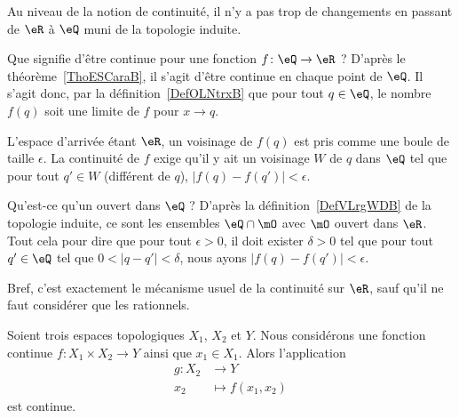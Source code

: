 Au niveau de la notion de continuité, il n'y a pas trop de changements en passant de \( \eR\) à \( \eQ\) muni de la topologie induite.

\begin{example}     \label{EXooHWIIooYYbfGE}
	Que signifie d'être continue pour une fonction \( f\colon \eQ\to \eR\) ? D'après le théorème~\ref{ThoESCaraB}, il s'agit d'être continue en chaque point de \( \eQ\). Il s'agit donc, par la définition~\ref{DefOLNtrxB} que pour tout \( q\in \eQ\), le nombre \( f(q)\) soit une limite de \( f\) pour \( x\to q\).

	L'espace d'arrivée étant \( \eR\), un voisinage de \( f(q)\) est pris comme une boule de taille \( \epsilon\). La continuité de \( f\) exige qu'il y ait un voisinage \( W\) de \( q\) dans \( \eQ\) tel que pour tout \( q'\in W\) (différent de \( q\)), \( | f(q)-f(q') |<\epsilon\).

	Qu'est-ce qu'un ouvert dans \( \eQ\) ? D'après la définition~\ref{DefVLrgWDB} de la topologie induite, ce sont les ensembles \( \eQ\cap\mO\) avec \( \mO\) ouvert dans \( \eR\). Tout cela pour dire que pour tout \( \epsilon>0\), il doit exister \( \delta>0\) tel que pour tout \( q'\in \eQ\) tel que \( 0<| q-q' |<\delta\), nous ayons \( | f(q)-f(q') |<\epsilon\).

	Bref, c'est exactement le mécanisme usuel de la continuité sur \( \eR\), sauf qu'il ne faut considérer que les rationnels.
\end{example}

\begin{lemma}       \label{LEMooHAODooYSPmvH}
	Soient trois espaces topologiques \( X_1\), \( X_2\) et \( Y\). Nous considérons une fonction continue \( f\colon X_1\times X_2\to Y\) ainsi que \( x_1\in X_1\). Alors l'application
	\begin{equation}
		\begin{aligned}
			g\colon X_2 & \to Y              \\
			x_2         & \mapsto f(x_1,x_2)
		\end{aligned}
	\end{equation}
	est continue.
\end{lemma}

